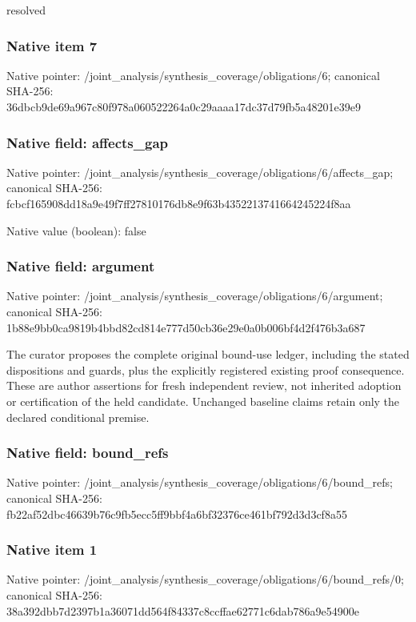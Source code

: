 \documentclass[10pt,a4paper]{article}
\begin{document}
\begingroup\raggedright\sloppy resolved\par\endgroup

\subsubsection{Native item 7}
Native pointer: /joint\_\allowbreak{}analysis/synthesis\_\allowbreak{}coverage/obligations/6; canonical SHA-256: 36dbcb9de69a967c80f978a060522264a0c29aaaa17dc37d79fb5a48201e39e9

\subsubsection{Native field: affects\_\allowbreak{}gap}
Native pointer: /joint\_\allowbreak{}analysis/synthesis\_\allowbreak{}coverage/obligations/6/affects\_\allowbreak{}gap; canonical SHA-256: fcbcf165908dd18a9e49f7ff27810176db8e9f63b4352213741664245224f8aa

Native value (boolean): false

\subsubsection{Native field: argument}
Native pointer: /joint\_\allowbreak{}analysis/synthesis\_\allowbreak{}coverage/obligations/6/argument; canonical SHA-256: 1b88e9bb0ca9819b4bbd82cd814e777d50cb36e29e0a0b006bf4d2f476b3a687

\begingroup\raggedright\sloppy The curator proposes the complete original bound-use ledger,\allowbreak{} including the stated dispositions and guards,\allowbreak{} plus the explicitly registered existing proof consequence. These are author assertions for fresh independent review,\allowbreak{} not inherited adoption or certification of the held candidate. Unchanged baseline claims retain only the declared conditional premise.\par\endgroup

\subsubsection{Native field: bound\_\allowbreak{}refs}
Native pointer: /joint\_\allowbreak{}analysis/synthesis\_\allowbreak{}coverage/obligations/6/bound\_\allowbreak{}refs; canonical SHA-256: fb22af52dbc46639b76c9fb5ecc5ff9bbf4a6bf32376ce461bf792d3d3cf8a55

\subsubsection{Native item 1}
Native pointer: /joint\_\allowbreak{}analysis/synthesis\_\allowbreak{}coverage/obligations/6/bound\_\allowbreak{}refs/0; canonical SHA-256: 38a392dbb7d2397b1a36071dd564f84337c8ccffae62771c6dab786a9e54900e
\end{document}
